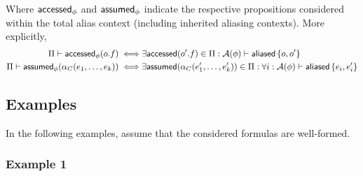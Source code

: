 \noindent
Where $\textsf{accessed}_\phi$ and $\textsf{assumed}_\phi$ indicate the respective propositions considered within the total alias context (including inherited aliasing contexts). More explicitly,
\begin{align*}
\Pi \vdash \textsf{accessed}_\phi(o.f)
\iff &
  \exists \textsf{accessed}(o^\prime.f) \in \Pi :
  \mathcal{A}(\phi) \vdash \textsf{aliased}\left\{ o, o^\prime \right\}
\\
\Pi \vdash \textsf{assumed}_\phi(\alpha_C(e_1, \dots, e_k))
\iff &
  \exists \textsf{assumed}(\alpha_C(e^\prime_1, \dots, e^\prime_k)) \in \Pi :
  \forall i : \mathcal{A}(\phi) \vdash \textsf{aliased}\left\{ e_i, e^\prime_i \right\}
\end{align*}

\newpage
\subsection{Examples}

In the following examples, assume that the considered formulas are well-formed.

\subsubsection*{Example 1}

